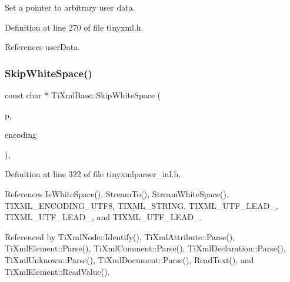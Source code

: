Set a pointer to arbitrary user data. 



Definition at line 270 of file tinyxml.\+h.



References user\+Data.

\hypertarget{class_ti_xml_base_ac0c3d66d8a9e6996a1fa016275e16875}{}\label{class_ti_xml_base_ac0c3d66d8a9e6996a1fa016275e16875} 
\subsubsection{\texorpdfstring{Skip\+White\+Space()}{SkipWhiteSpace()}}
{\footnotesize\ttfamily const char $\ast$ Ti\+Xml\+Base\+::\+Skip\+White\+Space (\begin{DoxyParamCaption}\item[{const char $\ast$}]{p,  }\item[{\hyperlink{tinyxml_8h_a88d51847a13ee0f4b4d320d03d2c4d96}{Ti\+Xml\+Encoding}}]{encoding }\end{DoxyParamCaption})\hspace{0.3cm}{\ttfamily [static]}, {\ttfamily [protected]}}



Definition at line 322 of file tinyxmlparser\+\_\+inl.\+h.



References Is\+White\+Space(), Stream\+To(), Stream\+White\+Space(), T\+I\+X\+M\+L\+\_\+\+E\+N\+C\+O\+D\+I\+N\+G\+\_\+\+U\+T\+F8, T\+I\+X\+M\+L\+\_\+\+S\+T\+R\+I\+NG, T\+I\+X\+M\+L\+\_\+\+U\+T\+F\+\_\+\+L\+E\+A\+D\+\_, T\+I\+X\+M\+L\+\_\+\+U\+T\+F\+\_\+\+L\+E\+A\+D\+\_, and T\+I\+X\+M\+L\+\_\+\+U\+T\+F\+\_\+\+L\+E\+A\+D\+\_.



Referenced by Ti\+Xml\+Node\+::\+Identify(), Ti\+Xml\+Attribute\+::\+Parse(), Ti\+Xml\+Element\+::\+Parse(), Ti\+Xml\+Comment\+::\+Parse(), Ti\+Xml\+Declaration\+::\+Parse(), Ti\+Xml\+Unknown\+::\+Parse(), Ti\+Xml\+Document\+::\+Parse(), Read\+Text(), and Ti\+Xml\+Element\+::\+Read\+Value().

\hypertarget{class_ti_xml_base_aac761023c11f3216de865f0a4b2b137b}{}\label{class_ti_xml_base_aac761023c11f3216de865f0a4b2b137b} 
